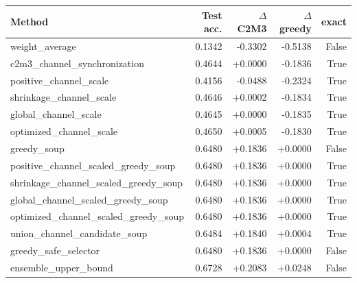 \begin{tabular}{lrrrr}
\toprule
Method & Test acc. & $\Delta$ C2M3 & $\Delta$ greedy & exact \\
\midrule
weight\_average & 0.1342 & -0.3302 & -0.5138 & False \\
c2m3\_channel\_synchronization & 0.4644 & +0.0000 & -0.1836 & True \\
positive\_channel\_scale & 0.4156 & -0.0488 & -0.2324 & True \\
shrinkage\_channel\_scale & 0.4646 & +0.0002 & -0.1834 & True \\
global\_channel\_scale & 0.4645 & +0.0000 & -0.1835 & True \\
optimized\_channel\_scale & 0.4650 & +0.0005 & -0.1830 & True \\
greedy\_soup & 0.6480 & +0.1836 & +0.0000 & False \\
positive\_channel\_scaled\_greedy\_soup & 0.6480 & +0.1836 & +0.0000 & True \\
shrinkage\_channel\_scaled\_greedy\_soup & 0.6480 & +0.1836 & +0.0000 & True \\
global\_channel\_scaled\_greedy\_soup & 0.6480 & +0.1836 & +0.0000 & True \\
optimized\_channel\_scaled\_greedy\_soup & 0.6480 & +0.1836 & +0.0000 & True \\
union\_channel\_candidate\_soup & 0.6484 & +0.1840 & +0.0004 & True \\
greedy\_safe\_selector & 0.6480 & +0.1836 & +0.0000 & False \\
ensemble\_upper\_bound & 0.6728 & +0.2083 & +0.0248 & False \\
\bottomrule
\end{tabular}
